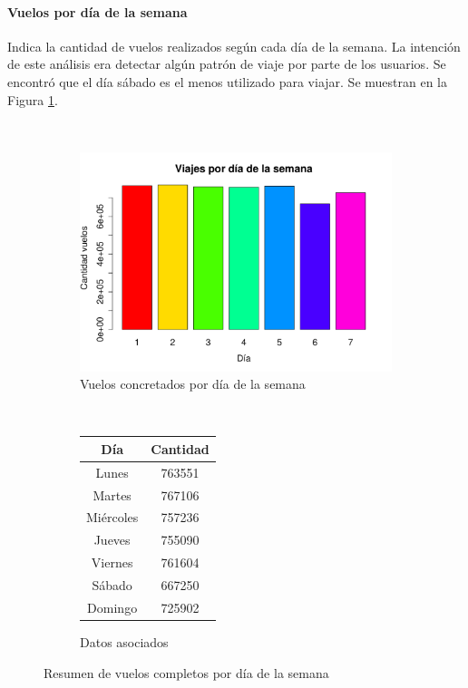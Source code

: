 \documentclass[12pt]{article}
\numberwithin{equation}{section}
\numberwithin{table}{section}
\numberwithin{figure}{section}
\begin{document}
\paragraph{Vuelos por día de la semana}
Indica la cantidad de vuelos realizados según cada día de la semana.
La intención de este análisis era detectar algún patrón de viaje por parte de los usuarios.
Se encontró que el día sábado es el menos utilizado para viajar.
Se muestran en la Figura \ref{fig:concretados-por-dia-semana}.

\begin{figure}
        \centering
        ~
        \begin{subfigure}[b]{0.6\textwidth}
                \includegraphics[width=1\columnwidth]{imagenes/completos/viajes-por-dia-semana}
                \caption{Vuelos concretados por día de la semana}
        \end{subfigure}
        ~
        \begin{subfigure}[b]{0.3\textwidth}
\begin{tabular}{@{}cc@{}}
\toprule
\textbf{Día} & \textbf{Cantidad} \\ \midrule
Lunes        & 763551            \\
Martes       & 767106            \\
Miércoles    & 757236            \\
Jueves       & 755090            \\
Viernes      & 761604            \\
Sábado       & 667250            \\
Domingo      & 725902            \\ \bottomrule
\end{tabular}  
\caption{Datos asociados}
        \end{subfigure}
        \caption{Resumen de vuelos completos por día de la semana}
        \label{fig:concretados-por-dia-semana}
\end{figure}
\end{document}
